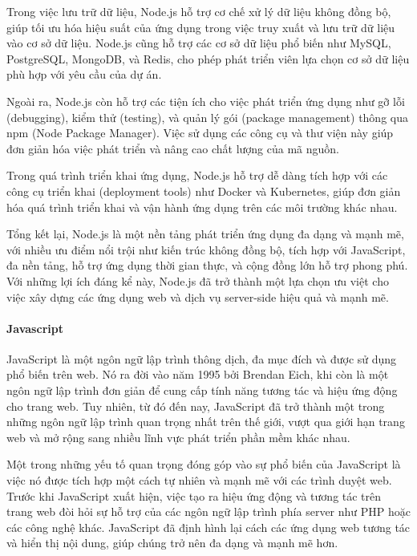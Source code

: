Trong việc lưu trữ dữ liệu, Node.js hỗ trợ cơ chế xử lý dữ liệu không đồng bộ, giúp tối ưu hóa hiệu suất của ứng dụng trong việc truy xuất và lưu trữ dữ liệu vào cơ sở dữ liệu. Node.js cũng hỗ trợ các cơ sở dữ liệu phổ biến như MySQL, PostgreSQL, MongoDB, và Redis, cho phép phát triển viên lựa chọn cơ sở dữ liệu phù hợp với yêu cầu của dự án.

Ngoài ra, Node.js còn hỗ trợ các tiện ích cho việc phát triển ứng dụng như gỡ lỗi (debugging), kiểm thử (testing), và quản lý gói (package management) thông qua npm (Node Package Manager). Việc sử dụng các công cụ và thư viện này giúp đơn giản hóa việc phát triển và nâng cao chất lượng của mã nguồn.

Trong quá trình triển khai ứng dụng, Node.js hỗ trợ dễ dàng tích hợp với các công cụ triển khai (deployment tools) như Docker và Kubernetes, giúp đơn giản hóa quá trình triển khai và vận hành ứng dụng trên các môi trường khác nhau.

Tổng kết lại, Node.js là một nền tảng phát triển ứng dụng đa dạng và mạnh mẽ, với nhiều ưu điểm nổi trội như kiến trúc không đồng bộ, tích hợp với JavaScript, đa nền tảng, hỗ trợ ứng dụng thời gian thực, và cộng đồng lớn hỗ trợ phong phú. Với những lợi ích đáng kể này, Node.js đã trở thành một lựa chọn ưu việt cho việc xây dựng các ứng dụng web và dịch vụ server-side hiệu quả và mạnh mẽ.

\paragraph{Javascript}
\mbox{}

JavaScript là một ngôn ngữ lập trình thông dịch, đa mục đích và được sử dụng phổ biến trên web. Nó ra đời vào năm 1995 bởi Brendan Eich, khi còn là một ngôn ngữ lập trình đơn giản để cung cấp tính năng tương tác và hiệu ứng động cho trang web. Tuy nhiên, từ đó đến nay, JavaScript đã trở thành một trong những ngôn ngữ lập trình quan trọng nhất trên thế giới, vượt qua giới hạn trang web và mở rộng sang nhiều lĩnh vực phát triển phần mềm khác nhau.

Một trong những yếu tố quan trọng đóng góp vào sự phổ biến của JavaScript là việc nó được tích hợp một cách tự nhiên và mạnh mẽ với các trình duyệt web. Trước khi JavaScript xuất hiện, việc tạo ra hiệu ứng động và tương tác trên trang web đòi hỏi sự hỗ trợ của các ngôn ngữ lập trình phía server như PHP hoặc các công nghệ khác. JavaScript đã định hình lại cách các ứng dụng web tương tác và hiển thị nội dung, giúp chúng trở nên đa dạng và mạnh mẽ hơn.

